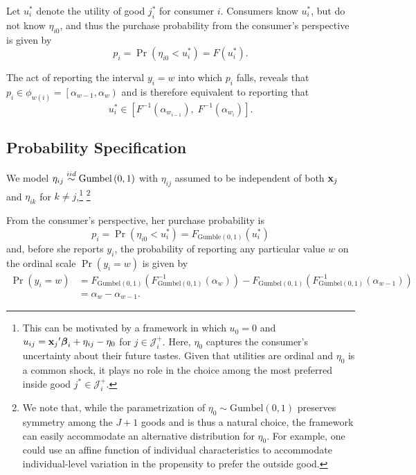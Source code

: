 \documentclass[
  letterpaper,
  DIV=11,
  numbers=noendperiod]{scrartcl}
\begin{document}
Let \(u_i^*\) denote the utility of good \(j^*_i\) for consumer \(i\).
Consumers know \(u_i^*\), but do not know \(\eta_{i0}\), and thus the
purchase probability from the consumer's perspective is given by \[
p_i = \Pr \left( \eta_{i0} < u_i^* \right) = F\left( u_i^* \right).
\]

The act of reporting the interval \(y_i=w\) into which \(p_i\) falls,
reveals that
\(p_i \in \phi_{w\left(i\right)} = \left[\alpha_{w-1},\alpha_w\right)\)
and is therefore equivalent to reporting that \[
u_i^* \in \left[
    F^{-1} \left( \alpha_{w_{i-1}} \right), \;
    F^{-1} \left( \alpha_{w_i}     \right)
\right].
\]

\subsection{Probability Specification}\label{probability-specification}

We model \(\eta_{ij} \stackrel{iid}{\sim} \text{Gumbel} \left( 0,1 \right)\) with
\(\eta_{ij}\) assumed to be independent of both \(\mathbf{x}_j\) and
\(\eta_{ik}\) for \(k \ne j\),\footnote{This can be motivated by a
  framework in which \(u_0 = 0\) and
  \(u_{ij} = {\mathbf{x}_j}'\boldsymbol{\beta}_i + \eta_{ij} - \eta_0\) for
  \(j \in \mathcal{J}^{+}_i\). Here, \(\eta_0\) captures the consumer's
  uncertainty about their future tastes. Given that utilities are
  ordinal and \(\eta_0\) is a common shock, it plays no role in the
  choice among the most preferred inside good
  \(j^* \in \mathcal{J}^{+}_i\).} \footnote{We note that, while the
  parametrization of \(\eta_0 \sim \text{Gumbel}\left(0,1\right)\)
  preserves symmetry among the \(J+1\) goods and is thus a natural
  choice, the framework can easily accommodate an alternative
  distribution for \(\eta_0\). For example, one could use an affine
  function of individual characteristics to accommodate individual-level
  variation in the propensity to prefer the outside good.}

From the consumer's perspective, her purchase probability is \[
p_i = \Pr \left( \eta_{i0} < u_i^* \right) = F_{\text{Gumble}\left(0,1\right)} \left( u_i^* \right)
\] and, before she reports \(y_i\), the probability of reporting any
particular value \(w\) on the ordinal scale \(\Pr(y_i=w)\) is given by
\[
\begin{aligned}
    \Pr(y_i=w)
    &= 
    F_{\text{Gumbel}\left(0,1\right)} \left( F^{-1}_{\text{Gumbel}\left(0,1\right)} \left( \alpha_w \right) \right) - 
    F_{\text{Gumbel}\left(0,1\right)} \left( F^{-1}_{\text{Gumbel}\left(0,1\right)} \left( \alpha_{w-1} \right) \right) \\
    &=
    \alpha_w - \alpha_{w-1}.
\end{aligned}
\]
\end{document}
